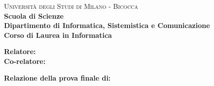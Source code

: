 
\begin{titlepage}
    
    \noindent
    \begin{minipage}[t]{0.18\textwidth}
    \end{minipage}
    \begin{minipage}[t]{0.8\textwidth}
    {
            {
            \textsc{Università degli Studi di Milano - Bicocca}} \\
            \textbf{Scuola di Scienze} \\
            \textbf{Dipartimento di Informatica, Sistemistica e Comunicazione} \\
            \textbf{Corso di Laurea in Informatica} \\
            \par
    }
    \end{minipage}
    
\vspace{40mm}
    
\begin{center}
        {\LARGE{
                \textbf{\thetitle}
                \par
        }}
    \end{center}
    
    \vspace{50mm}

    \noindent
    {\large \textbf{Relatore:} \supervisor } \\

    \noindent
    {\large \textbf{Co-relatore:} \cosupervisor}
    
    \vspace{15mm}

    \begin{flushright}
        {\large \textbf{Relazione della prova finale di:}} \\
        \large{\theauthor} \\
        \large{\immatricolation} 
    \end{flushright}
    
    \vspace{30mm}
    \begin{center}
        {\large{\bf \academicyear}}
    \end{center}

    \restoregeometry
    
\end{titlepage}